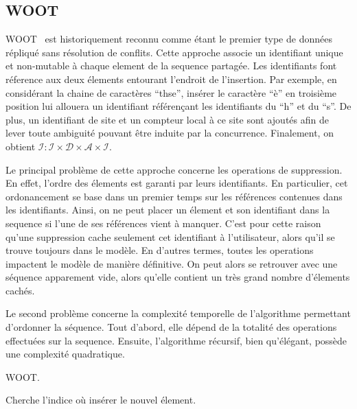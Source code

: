 
\subsection{WOOT}

WOOT~\cite{oster2006data} est historiquement reconnu comme étant le premier
type de données répliqué sans résolution de conflits. Cette approche associe un
identifiant unique et non-mutable à chaque element de la sequence partagée. Les
identifiants font réference aux deux élements entourant l'endroit de
l'insertion. Par exemple, en considérant la chaine de caractères ``thse'',
insérer le caractère ``è'' en troisième position lui allouera un identifiant
référençant les identifiants du ``h'' et du ``s''. De plus, un identifiant de
site et un compteur local à ce site sont ajoutés afin de lever toute ambiguité
pouvant être induite par la concurrence. Finalement, on obtient
$\mathcal{I}: \mathcal{I} \times \mathcal{D} \times \mathcal{A} \times
\mathcal{I}$.

Le principal problème de cette approche concerne les operations de suppression.
En effet, l'ordre des élements est garanti par leurs identifiants. En
particulier, cet ordonancement se base dans un premier temps sur les références
contenues dans les identifiants. Ainsi, on ne peut placer un élement et son
identifiant dans la sequence si l'une de ses références vient à manquer. C'est
pour cette raison qu'une suppression cache seulement cet identifiant à
l'utilisateur, alors qu'il se trouve toujours dans le modèle. En d'autres
termes, toutes les operations impactent le modèle de manière définitive. On
peut alors se retrouver avec une séquence apparement vide, alors qu'elle
contient un très grand nombre d'élements cachés.

Le second problème concerne la complexité temporelle de l'algorithme permettant
d'ordonner la séquence. Tout d'abord, elle dépend de la totalité des operations
effectuées sur la sequence. Ensuite, l'algorithme récursif, bien qu'élégant,
possède une complexité quadratique.

\begin{algorithm}
  
  \caption{\label{algo:woot}WOOT.}
\end{algorithm}

\begin{algorithm}
  
  \caption{\label{algo:wootrecurs}Cherche l'indice où insérer le nouvel 
    élement.}
\end{algorithm}

